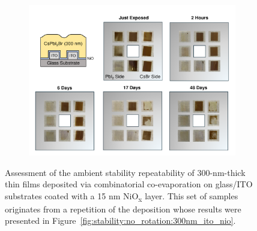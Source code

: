 \begin{figure}[htbp]
    \centering
    \begin{subfigure}[t]{0.99\textwidth}
        \centering
        \includegraphics[width=\textwidth]{chapters/appendixB/images/Stability_No_Rotation_275_on_nio_repeated.pdf} %
             
    \end{subfigure}

\caption[Assessment of the ambient stability repeatability of 300-nm-thick  thin films deposited via combinatorial co-evaporation on glass/ITO substrates coated with a 15 nm NiO\textsubscript{x} layer.]{Assessment of the ambient stability repeatability of 300-nm-thick  thin films deposited via combinatorial co-evaporation on glass/ITO substrates coated with a 15 nm NiO\textsubscript{x} layer. This set of samples originates from a repetition of the deposition whose results were presented in Figure~\ref{fig:stability:no_rotation:300nm_ito_nio}.}
\label{fig:appendix:stability_on_NiO_v2}
\end{figure}

\cleardoublepage

